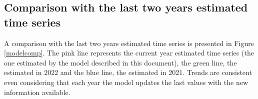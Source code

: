 \documentclass[review]{elsarticle}
\begin{document}
\subsection{Comparison with the last two years estimated time series}

A comparison with the last two years estimated time series is presented in Figure \ref{modelcomp}. The pink line represents the current year estimated time series (the one estimated by the model described in this document), the green line, the estimated in 2022 and the blue line, the estimated in 2021. Trends are consistent even considering that each year the model updates the last values with the new information available. %
\end{document}
